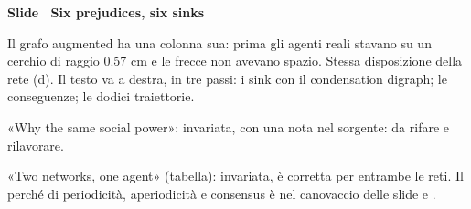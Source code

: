 \par\addvspace{14pt}\noindent\begin{minipage}{\textwidth}
{\color{unipd}\bfseries Slide  \textperiodcentered\ Six prejudices, six sinks}\par\smallskip
{\small Il grafo augmented ha una colonna sua: prima gli agenti reali stavano su un cerchio di raggio 0.57 cm e le frecce non avevano spazio. Stessa disposizione della rete (d). Il testo va a destra, in tre passi: i sink con il condensation digraph; le conseguenze; le dodici traiettorie.}\par\smallskip
\noindent\begin{minipage}[t]{0.36\textwidth}\par
{}\par\smallskip
{}\par\smallskip
\end{minipage}\hfill\begin{minipage}[t]{0.61\textwidth}\par
{}\par\smallskip
{}\par\smallskip
{}\par\smallskip
\end{minipage}\par
\end{minipage}\par
\par\smallskip\noindent «Why the same social power»: invariata, con una nota nel sorgente: da rifare e rilavorare.\par
\par\smallskip\noindent «Two networks, one agent» (tabella): invariata, è corretta per entrambe le reti. Il perché di periodicità, aperiodicità e consensus è nel canovaccio delle slide  e .\par
\clearpage
